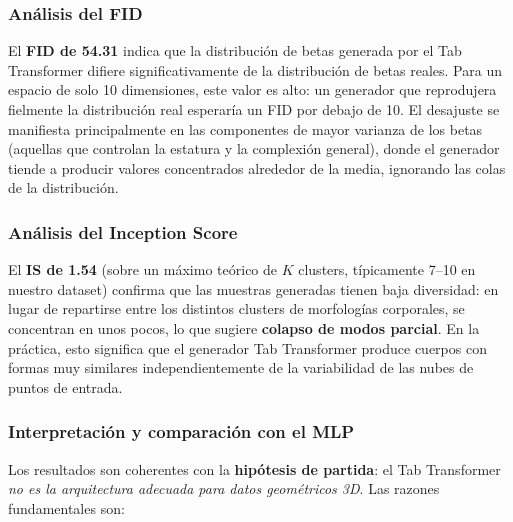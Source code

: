 \documentclass[a4paper,11pt]{article}
\begin{document}
\subsubsection{Análisis del FID}

El \textbf{FID de 54.31} indica que la distribución de betas generada por
el Tab Transformer difiere significativamente de la distribución de betas
reales. Para un espacio de solo 10 dimensiones, este valor es alto: un
generador que reprodujera fielmente la distribución real esperaría un FID
por debajo de 10. El desajuste se manifiesta principalmente en las
componentes de mayor varianza de los betas (aquellas que controlan la
estatura y la complexión general), donde el generador tiende a producir
valores concentrados alrededor de la media, ignorando las colas de la
distribución.

\subsubsection{Análisis del Inception Score}

El \textbf{IS de 1.54} (sobre un máximo teórico de $K$ clusters,
típicamente 7--10 en nuestro dataset) confirma que las muestras generadas
tienen baja diversidad: en lugar de repartirse entre los distintos clusters
de morfologías corporales, se concentran en unos pocos, lo que sugiere
\textbf{colapso de modos parcial}. En la práctica, esto significa que el
generador Tab Transformer produce cuerpos con formas muy similares
independientemente de la variabilidad de las nubes de puntos de entrada.

\subsubsection{Interpretación y comparación con el MLP}

Los resultados son coherentes con la \textbf{hipótesis de partida}: el Tab
Transformer \emph{no es la arquitectura adecuada para datos geométricos 3D}.
Las razones fundamentales son:
\end{document}
